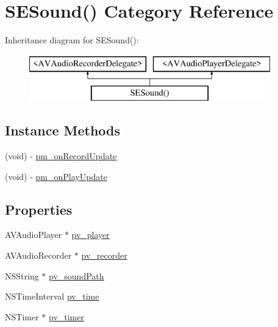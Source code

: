 \hypertarget{category_s_e_sound_07_08}{\section{S\-E\-Sound() Category Reference}
\label{category_s_e_sound_07_08}
}
Inheritance diagram for S\-E\-Sound()\-:\begin{figure}[H]
\begin{center}
\leavevmode
\includegraphics[height=2.000000cm]{category_s_e_sound_07_08}
\end{center}
\end{figure}
\subsection*{Instance Methods}
\begin{DoxyCompactItemize}
\item 
(void) -\/ \hyperlink{category_s_e_sound_07_08_aef76de5d05ef2d1d7f5259ccc7e7b5bc}{pm\-\_\-on\-Record\-Update}
\item 
(void) -\/ \hyperlink{category_s_e_sound_07_08_ae3107a3a40530536207d056096e4b1fb}{pm\-\_\-on\-Play\-Update}
\end{DoxyCompactItemize}
\subsection*{Properties}
\begin{DoxyCompactItemize}
\item 
A\-V\-Audio\-Player $\ast$ \hyperlink{category_s_e_sound_07_08_a37e65b6d871b963969a748ab2a83977f}{pv\-\_\-player}
\item 
A\-V\-Audio\-Recorder $\ast$ \hyperlink{category_s_e_sound_07_08_ad4cf66dfc869298706199d2563336d81}{pv\-\_\-recorder}
\item 
N\-S\-String $\ast$ \hyperlink{category_s_e_sound_07_08_a5253ec4a59b50d74e4e11c59594041bd}{pv\-\_\-sound\-Path}
\item 
N\-S\-Time\-Interval \hyperlink{category_s_e_sound_07_08_ae2a2812f1b7e4c6f9dedc2d468985248}{pv\-\_\-time}
\item 
N\-S\-Timer $\ast$ \hyperlink{category_s_e_sound_07_08_a442a4628a62297b4978869a0c762e8db}{pv\-\_\-timer}
\end{DoxyCompactItemize}


